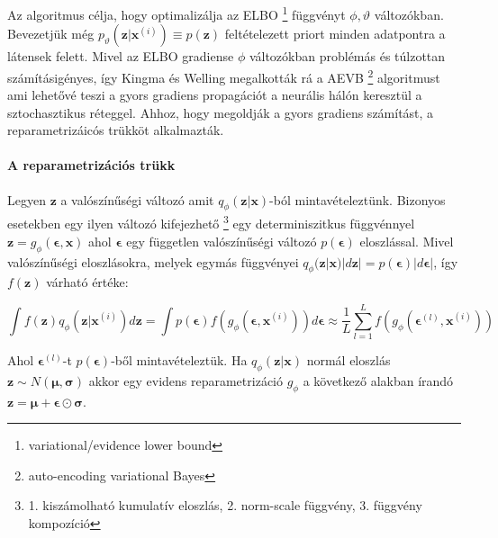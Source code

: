 \documentclass[12pt, english]{article}
\begin{document}
\vspace{4mm}

\par Az algoritmus célja, hogy optimalizálja az ELBO \footnote{variational/evidence lower bound} függvényt $\phi, \vartheta$ változókban. Bevezetjük még $p_{\vartheta}(\bm{z} | \bm{x}^{(i)}) \equiv p(\bm{z})$ feltételezett priort minden adatpontra a látensek felett. Mivel az ELBO gradiense $\phi$ változókban problémás és túlzottan számításigényes, így Kingma és Welling megalkották rá a AEVB \footnote{auto-encoding variational Bayes} algoritmust ami lehetővé teszi a gyors gradiens propagációt a neurális hálón keresztül a sztochasztikus réteggel. Ahhoz, hogy megoldják a gyors gradiens számítást, a reparametrizáicós trükköt alkalmazták.

\vspace{4mm}

\paragraph{A reparametrizációs trükk \newline \newline}

\vspace{4mm}

\par Legyen $\bm{z}$ a valószínűségi változó amit $q_{\phi}(\bm{z} | \bm{x})$-ból mintavételeztünk. Bizonyos esetekben egy ilyen változó kifejezhető \footnote{1. kiszámolható kumulatív eloszlás, 2. norm-scale függvény, 3. függvény kompozíció} egy determiniszitkus függvénnyel $\bm{z} = g_{\phi}(\bm{\epsilon}, \bm{x})$ ahol $\bm{\epsilon}$ egy független valószínűségi változó $p(\bm{\epsilon})$ eloszlással. Mivel valószínűségi eloszlásokra, melyek egymás függvényei $q_{\phi}(\bm{z} | \bm{x})|d\bm{z}| = p(\bm{\epsilon})|d\bm{\epsilon}|$, így $f(\bm{z})$ várható értéke:

\vspace{4mm}

\begin{equation}
    \int f(\bm{z})q_{\phi}(\bm{z} | \bm{x}^{(i)})d\bm{z} = \int p(\bm{\epsilon})f(g_{\phi}(\bm{\epsilon}, \bm{x}^{(i)})) d\bm{\epsilon} \approx \frac{1}{L}\sum_{l=1}^{L}f(g_{\phi}(\bm{\epsilon}^{(l)}, \bm{x}^{(i)}))
\end{equation}

\vspace{4mm}

\par Ahol $\bm{\epsilon}^{(l)}$-t $p(\bm{\epsilon})$-ből mintavételeztük. Ha $q_{\phi}(\bm{z} | \bm{x})$ normál eloszlás $\bm{z} \sim N(\bm{\mu}, \bm{\sigma})$ akkor egy evidens reparametrizáció $g_{\phi}$ a következő alakban írandó $\bm{z} = \bm{\mu} + \bm{\epsilon} \odot \bm{\sigma}$.
\end{document}
